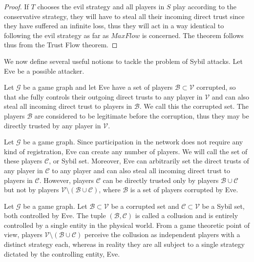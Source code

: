 \documentclass[11pt]{llncs}
\theoremstyle{definition}
\begin{document}
     \begin{proof}
        If $T$ chooses the evil strategy and all players in $S$ play according to the conservative strategy, they will have
        to steal all their incoming direct trust since they have suffered an infinite loss, thus they will act in a way
        identical to following the evil strategy as far as $MaxFlow$ is concerned. The theorem follows thus from the Trust
        Flow theorem.
     \end{proof}
     We now define several useful notions to tackle the problem of Sybil attacks. Let Eve be a possible attacker.
     \begin{definition}
        Let $\mathcal{G}$ be a game graph and let Eve have a set of players $\mathcal{B} \subset \mathcal{V}$ corrupted, so
        that she fully controls their outgoing direct trusts to any player in $\mathcal{V}$ and can also steal all incoming
        direct trust to players in $\mathcal{B}$. We call this the corrupted set. The players $\mathcal{B}$ are considered to
        be legitimate before the corruption, thus they may be directly trusted by any player in $\mathcal{V}$.
     \end{definition}
     \begin{definition}
        Let $\mathcal{G}$ be a game graph. Since participation in the network does not require any kind of registration, Eve
        can create any number of players. We will call the set of these players $\mathcal{C}$, or Sybil set. Moreover, Eve
        can arbitrarily set the direct trusts of any player in $\mathcal{C}$ to any player and can also steal all
        incoming direct trust to players in $\mathcal{C}$. However, players $\mathcal{C}$ can be directly trusted only by
        players $\mathcal{B} \cup \mathcal{C}$ but not by players $\mathcal{V} \setminus (\mathcal{B} \cup \mathcal{C})$,
        where $\mathcal{B}$ is a set of players corrupted by Eve.
     \end{definition}
     \begin{definition}[Collusion]
        Let $\mathcal{G}$ be a game graph. Let $\mathcal{B} \subset \mathcal{V}$ be a corrupted set and $\mathcal{C} \subset
        \mathcal{V}$ be a Sybil set, both controlled by Eve. The tuple $\left(\mathcal{B}, \mathcal{C}\right)$ is called a
        collusion and is entirely controlled by a single entity in the physical world. From a game theoretic point of view,
        players $\mathcal{V} \setminus (\mathcal{B} \cup \mathcal{C})$ perceive the collusion as independent players with a
        distinct strategy each, whereas in reality they are all subject to a single strategy dictated by the controlling
        entity, Eve.
     \end{definition}
\end{document}
